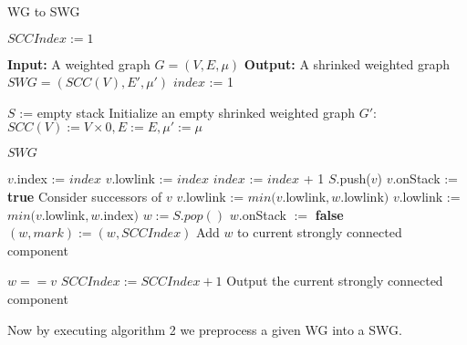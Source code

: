\documentclass[12pt]{article}
\begin{document}
\begin{algorithm}
	\caption{WG to SWG}
	\begin{algorithmic}[1]
	\State $SCCIndex := 1$
		
		\State\textbf{Input:} A weighted graph $G = (V,E,\mu)$
		\State\textbf{Output:} A shrinked weighted graph $SWG = (SCC(V), E', \mu')$	
		\State 
		\State $index$ := 1
		
		\State $S$ := empty stack
		\State Initialize  an empty shrinked weighted graph $G'$: 
		\State $SCC(V) := V\times {0}, E:=E, \mu' := \mu$
			
		\State  
				\State {}
			\EndIf
		\EndFor
		\State\Return $SWG$
		\EndFunction
		
		\State
			\State $v.$index := $index$
			\State $v$.lowlink := $index$
			\State $index$ := $index$ + 1
			\State $S$.push($v$)
			\State $v$.onStack := \textbf{true}
			\State			
			\State \Comment Consider successors of $v$
					\State{}
					\State $v$.lowlink := $min(v$.lowlink$, w$.lowlink$ )$ 
					\State $v$.lowlink := $min(v$.lowlink$, w. $index$)$ 
				\EndIf
			\EndFor
			\State
				\Repeat
					\State $w := S.pop()$					
					\State $w$.onStack $:= $ \textbf{false}
					\State $(w, mark) := (w, SCCIndex)$
					\State \Comment Add $w$ to current strongly connected component 
				
				
				\Until
				$w == v$
				\State $SCCIndex := SCCIndex + 1$ 
				\State\Comment Output the current strongly connected component
			\EndIf
		\EndFunction
	\end{algorithmic}

\end{algorithm}
 
Now by executing algorithm 2 we preprocess a given WG into a SWG.
\end{document}
